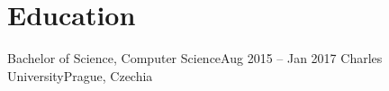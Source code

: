 \section{Education}
\mySubHeadingListStart

  \mySubHeading
    {Bachelor of Science, Computer Science}{Aug 2015 -- Jan 2017}
    { Charles University}{Prague, Czechia}
    \myItemListStart
    \myItemListEnd

\mySubHeadingListEnd
